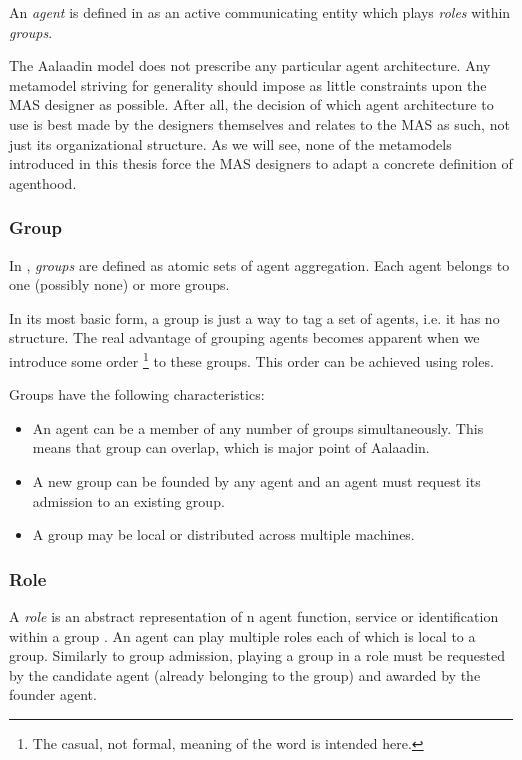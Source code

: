 An \textit{agent} is defined in \cite{Ferber97} as an active communicating entity which plays \textit{roles} within \textit{groups}.

The Aalaadin model does not prescribe any particular agent architecture.
Any metamodel striving for generality should impose as little constraints upon the MAS designer as possible.
After all, the decision of which agent architecture to use is best made by the designers themselves and relates to the MAS as such, not just its organizational structure.
As we will see, none of the metamodels introduced in this thesis force the MAS designers to adapt a concrete definition of agenthood.

\subsubsection*{Group}

In \cite{Ferber97}, \textit{groups} are defined as atomic sets of agent aggregation.
Each agent belongs to one (possibly none) or more groups.

In its most basic form, a group is just a way to tag a set of agents, i.e. it has no structure.
The real advantage of grouping agents becomes apparent when we introduce some order \footnote{The casual, not formal, meaning of the word is intended here.} to these groups.
This order can be achieved using roles.

Groups have the following characteristics:
\begin{itemize}
	\item An agent can be a member of any number of groups simultaneously.
	This means that group can overlap, which is major point of Aalaadin.
	\item A new group can be founded by any agent and an agent must request its admission to an existing group.
	\item A group may be local or distributed across multiple machines.
\end{itemize}

\subsubsection*{Role}

A \textit{role} is an abstract representation of n agent function, service or identification within a group \cite{Ferber97}.
An agent can play multiple roles each of which is local to a group.
Similarly to group admission, playing a group in a role must be requested by the candidate agent (already belonging to the group) and awarded by the founder agent.

